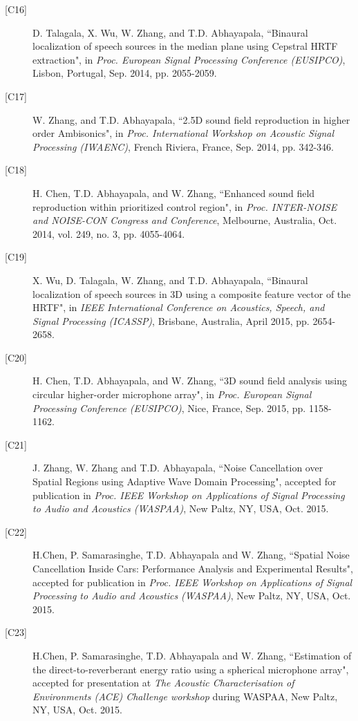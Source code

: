 \documentclass[10pt]{article}
\begin{document}
\begin{description}
\item[{[}C16{]}]D. Talagala, X. Wu, W. Zhang, and T.D. Abhayapala, ``Binaural localization of speech sources in the median plane using Cepstral HRTF extraction", in {\em Proc. European Signal Processing Conference (EUSIPCO)}, Lisbon, Portugal, Sep. 2014, pp. 2055-2059.

\item[{[}C17{]}]W. Zhang, and T.D. Abhayapala, ``2.5D sound field reproduction in higher order Ambisonics", in {\em Proc. International Workshop on Acoustic Signal Processing (IWAENC)}, French Riviera, France, Sep. 2014, pp. 342-346.

\item[{[}C18{]}]H. Chen, T.D. Abhayapala, and W. Zhang, ``Enhanced sound field reproduction within prioritized control region", in {\em Proc. INTER-NOISE and NOISE-CON Congress and Conference}, Melbourne, Australia, Oct. 2014, vol. 249, no. 3, pp. 4055-4064.

\item[{[}C19{]}]X. Wu, D. Talagala,  W. Zhang, and T.D. Abhayapala, ``Binaural localization of speech sources in 3D using a composite feature vector of the HRTF", in {\em IEEE International Conference on Acoustics, Speech, and Signal Processing (ICASSP)}, Brisbane, Australia, April 2015, pp. 2654-2658.

\item[{[}C20{]}]H. Chen, T.D. Abhayapala, and W. Zhang, ``3D sound field analysis using circular higher-order microphone array", in {\em Proc. European Signal Processing Conference (EUSIPCO)}, Nice, France, Sep. 2015, pp. 1158-1162.

\item[{[}C21{]}]J. Zhang, W. Zhang and T.D. Abhayapala, ``Noise Cancellation over Spatial Regions using Adaptive Wave Domain Processing", accepted for publication in {\em Proc. IEEE Workshop on Applications of Signal Processing to Audio and Acoustics (WASPAA)},  New Paltz, NY, USA, Oct. 2015.

\item[{[}C22{]}]H.Chen, P. Samarasinghe, T.D. Abhayapala and W. Zhang, ``Spatial Noise Cancellation Inside Cars: Performance Analysis and Experimental Results", accepted for publication in {\em Proc. IEEE Workshop on Applications of Signal Processing to Audio and Acoustics (WASPAA)},  New Paltz, NY, USA, Oct. 2015.

\item[{[}C23{]}]H.Chen, P. Samarasinghe, T.D. Abhayapala and W. Zhang, ``Estimation of the direct-to-reverberant energy ratio using a spherical microphone array", accepted for presentation at {\em The Acoustic Characterisation of Environments (ACE) Challenge workshop} during WASPAA,  New Paltz, NY, USA, Oct. 2015.

\vspace{-4mm}
\end{description}
\end{document}
